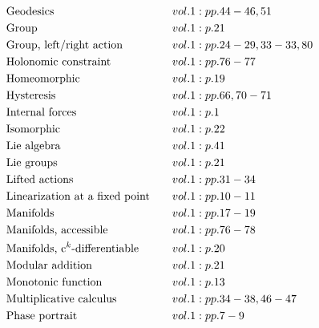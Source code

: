 \documentclass[a4paper]{article}
\begin{document}
\begin{align*}
&\text{Geodesics} \hspace*{1em}&& vol. 1: pp. 44-46, 51\\
&\text{Group} \hspace*{1em}&& vol. 1: p. 21\\
&\text{Group, left/right action} \hspace*{1em}&& vol. 1: pp. 24-29, 33-33, 80\\
&\text{Holonomic constraint} \hspace*{1em}&& vol. 1: pp. 76-77\\
&\text{Homeomorphic} \hspace*{1em}&& vol. 1: p. 19\\
&\text{Hysteresis} \hspace*{1em}&& vol. 1: pp. 66, 70-71\\
&\text{Internal forces} \hspace*{1em}&& vol. 1: p. 1\\
&\text{Isomorphic} \hspace*{1em}&& vol. 1: p. 22\\
&\text{Lie algebra} \hspace*{1em}&& vol. 1: p. 41\\
&\text{Lie groups} \hspace*{1em}&& vol. 1: p. 21\\
&\text{Lifted actions} \hspace*{1em}&& vol. 1: pp. 31-34\\
&\text{Linearization at a fixed point} \hspace*{1em}&& vol. 1: pp. 10-11\\
&\text{Manifolds} \hspace*{1em}&& vol. 1: pp. 17-19\\
&\text{Manifolds, accessible} \hspace*{1em}&& vol. 1: pp. 76-78\\
&\text{Manifolds, c$^k$-differentiable} \hspace*{1em}&& vol. 1: p. 20\\
&\text{Modular addition} \hspace*{1em}&& vol. 1: p. 21\\
&\text{Monotonic function} \hspace*{1em}&& vol. 1: p. 13\\
&\text{Multiplicative calculus} \hspace*{1em}&& vol. 1: pp. 34-38, 46-47\\
&\text{Phase portrait} \hspace*{1em}&& vol. 1: pp. 7-9\\

\end{align*}
\end{document}
